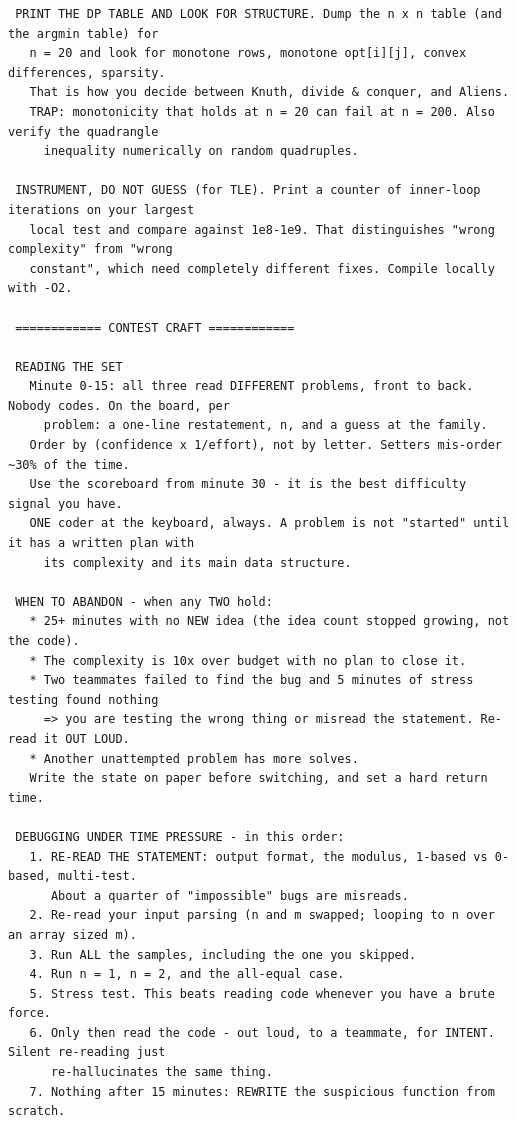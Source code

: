\documentclass[9pt,a4paper,twocolumn]{extarticle}
\begin{document}
\begin{lstlisting}
 PRINT THE DP TABLE AND LOOK FOR STRUCTURE. Dump the n x n table (and the argmin table) for
   n = 20 and look for monotone rows, monotone opt[i][j], convex differences, sparsity.
   That is how you decide between Knuth, divide & conquer, and Aliens.
   TRAP: monotonicity that holds at n = 20 can fail at n = 200. Also verify the quadrangle
     inequality numerically on random quadruples.

 INSTRUMENT, DO NOT GUESS (for TLE). Print a counter of inner-loop iterations on your largest
   local test and compare against 1e8-1e9. That distinguishes "wrong complexity" from "wrong
   constant", which need completely different fixes. Compile locally with -O2.

 ============ CONTEST CRAFT ============

 READING THE SET
   Minute 0-15: all three read DIFFERENT problems, front to back. Nobody codes. On the board, per
     problem: a one-line restatement, n, and a guess at the family.
   Order by (confidence x 1/effort), not by letter. Setters mis-order ~30% of the time.
   Use the scoreboard from minute 30 - it is the best difficulty signal you have.
   ONE coder at the keyboard, always. A problem is not "started" until it has a written plan with
     its complexity and its main data structure.

 WHEN TO ABANDON - when any TWO hold:
   * 25+ minutes with no NEW idea (the idea count stopped growing, not the code).
   * The complexity is 10x over budget with no plan to close it.
   * Two teammates failed to find the bug and 5 minutes of stress testing found nothing
     => you are testing the wrong thing or misread the statement. Re-read it OUT LOUD.
   * Another unattempted problem has more solves.
   Write the state on paper before switching, and set a hard return time.

 DEBUGGING UNDER TIME PRESSURE - in this order:
   1. RE-READ THE STATEMENT: output format, the modulus, 1-based vs 0-based, multi-test.
      About a quarter of "impossible" bugs are misreads.
   2. Re-read your input parsing (n and m swapped; looping to n over an array sized m).
   3. Run ALL the samples, including the one you skipped.
   4. Run n = 1, n = 2, and the all-equal case.
   5. Stress test. This beats reading code whenever you have a brute force.
   6. Only then read the code - out loud, to a teammate, for INTENT. Silent re-reading just
      re-hallucinates the same thing.
   7. Nothing after 15 minutes: REWRITE the suspicious function from scratch.


\end{lstlisting}
\end{document}
